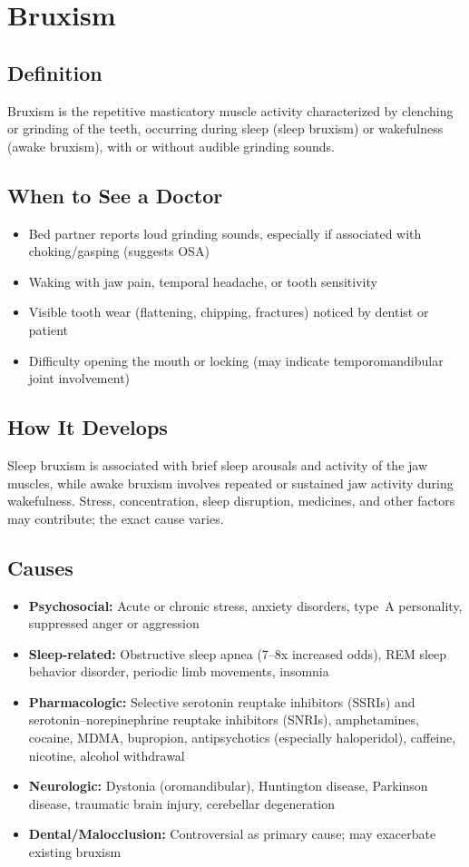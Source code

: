 \chapter{Bruxism}

\section*{Definition}
Bruxism is the repetitive masticatory muscle activity characterized by clenching or grinding of the teeth, occurring during sleep (sleep bruxism) or wakefulness (awake bruxism), with or without audible grinding sounds.

\section*{When to See a Doctor}

\begin{itemize}
 \item Bed partner reports loud grinding sounds, especially if associated with choking/gasping (suggests OSA)
 \item Waking with jaw pain, temporal headache, or tooth sensitivity
 \item Visible tooth wear (flattening, chipping, fractures) noticed by dentist or patient
 \item Difficulty opening the mouth or locking (may indicate temporomandibular joint involvement)
\end{itemize}

\section*{How It Develops}
Sleep bruxism is associated with brief sleep arousals and activity of the jaw muscles, while awake bruxism involves repeated or sustained jaw activity during wakefulness. Stress, concentration, sleep disruption, medicines, and other factors may contribute; the exact cause varies.

\section*{Causes}
\begin{itemize}
 \item \textbf{Psychosocial:} Acute or chronic stress, anxiety disorders, type~A personality, suppressed anger or aggression
 \item \textbf{Sleep-related:} Obstructive sleep apnea (7--8x increased odds), REM sleep behavior disorder, periodic limb movements, insomnia
 \item \textbf{Pharmacologic:} Selective serotonin reuptake inhibitors (SSRIs) and serotonin--norepinephrine reuptake inhibitors (SNRIs), amphetamines, cocaine, MDMA, bupropion, antipsychotics (especially haloperidol), caffeine, nicotine, alcohol withdrawal
 \item \textbf{Neurologic:} Dystonia (oromandibular), Huntington disease, Parkinson disease, traumatic brain injury, cerebellar degeneration
 \item \textbf{Dental/Malocclusion:} Controversial as primary cause; may exacerbate existing bruxism
\end{itemize}

